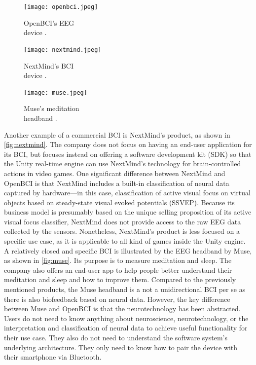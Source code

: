 \begin{figure}[!ht]
  \texttt{[image: openbci.jpeg]}
  \caption[OpenBCI’s EEG device.]{OpenBCI’s EEG \\ device \citep{be_superhvman_conor_2017}.}
  \label{fig:openbci}
  \endminipage\hfill
  \texttt{[image: nextmind.jpeg]}
  \caption[NextMind’s BCI device.]{NextMind’s BCI \\ device \citep{louise_neurotechnology_2019}.}
  \label{fig:nextmind}
  \endminipage\hfill
  \texttt{[image: muse.jpeg]}
  \caption[Muse’s meditation headband.]{Muse’s meditation \\ headband \citep{muse_muse_nodate}.}
  \label{fig:muse}
  \endminipage
\end{figure}

Another example of a commercial BCI is NextMind’s product, as shown in \autoref{fig:nextmind}. The company does not focus on having an end-user application for its BCI, but focuses instead on offering a software development kit (SDK) so that the Unity real-time engine can use NextMind’s technology for brain-controlled actions in video games. One significant difference between NextMind and OpenBCI is that NextMind includes a built-in classification of neural data captured by hardware—in this case, classification of active visual focus on virtual objects based on steady-state visual evoked potentials (SSVEP). Because its business model is presumably based on the unique selling proposition of its active visual focus classifier, NextMind does not provide access to the raw EEG data collected by the sensors. Nonetheless, NextMind’s product is less focused on a specific use case, as it is applicable to all kind of games inside the Unity engine. A relatively closed and specific BCI is illustrated by the EEG headband by Muse, as shown in \autoref{fig:muse}. Its purpose is to measure meditation and sleep. The company also offers an end-user app to help people better understand their meditation and sleep and how to improve them. Compared to the previously mentioned products, the Muse headband is a not a unidirectional BCI per se as there is also biofeedback based on neural data. However, the key difference between Muse and OpenBCI is that the neurotechnology has been abstracted. Users do not need to know anything about neuroscience, neurotechnology, or the interpretation and classification of neural data to achieve useful functionality for their use case. They also do not need to understand the software system’s underlying architecture. They only need to know how to pair the device with their smartphone via Bluetooth.

